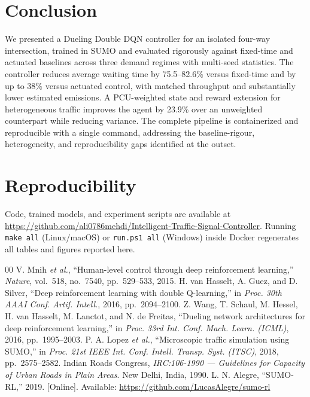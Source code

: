 \documentclass[conference]{IEEEtran}
\begin{document}
\section{Conclusion}
\label{sec:conclusion}
We presented a Dueling Double DQN controller for an isolated four-way
intersection, trained in SUMO and evaluated rigorously against fixed-time and
actuated baselines across three demand regimes with multi-seed statistics. The
controller reduces average waiting time by 75.5--82.6\% versus fixed-time and by
up to 38\% versus actuated control, with matched throughput and substantially
lower estimated emissions. A PCU-weighted state and reward extension for
heterogeneous traffic improves the agent by 23.9\% over an unweighted counterpart
while reducing variance. The complete pipeline is containerized and reproducible
with a single command, addressing the baseline-rigour, heterogeneity, and
reproducibility gaps identified at the outset.

\section*{Reproducibility}
Code, trained models, and experiment scripts are available at
\url{https://github.com/ali0786mehdi/Intelligent-Traffic-Signal-Controller}.
Running \texttt{make all} (Linux/macOS) or \texttt{run.ps1 all} (Windows) inside
Docker regenerates all tables and figures reported here.

\begin{thebibliography}{00}
 V. Mnih \emph{et al.}, ``Human-level control through deep
reinforcement learning,'' \emph{Nature}, vol.~518, no.~7540, pp.~529--533, 2015.
 H. van Hasselt, A. Guez, and D. Silver, ``Deep
reinforcement learning with double Q-learning,'' in \emph{Proc. 30th AAAI Conf.
Artif. Intell.}, 2016, pp.~2094--2100.
 Z. Wang, T. Schaul, M. Hessel, H. van Hasselt, M. Lanctot, and
N. de Freitas, ``Dueling network architectures for deep reinforcement learning,''
in \emph{Proc. 33rd Int. Conf. Mach. Learn. (ICML)}, 2016, pp.~1995--2003.
 P. A. Lopez \emph{et al.}, ``Microscopic traffic simulation
using SUMO,'' in \emph{Proc. 21st IEEE Int. Conf. Intell. Transp. Syst. (ITSC)},
2018, pp.~2575--2582.
 Indian Roads Congress, \emph{IRC:106-1990 --- Guidelines for
Capacity of Urban Roads in Plain Areas}. New Delhi, India, 1990.
 L. N. Alegre, ``SUMO-RL,'' 2019. [Online]. Available:
\url{https://github.com/LucasAlegre/sumo-rl}
\end{thebibliography}
\end{document}
